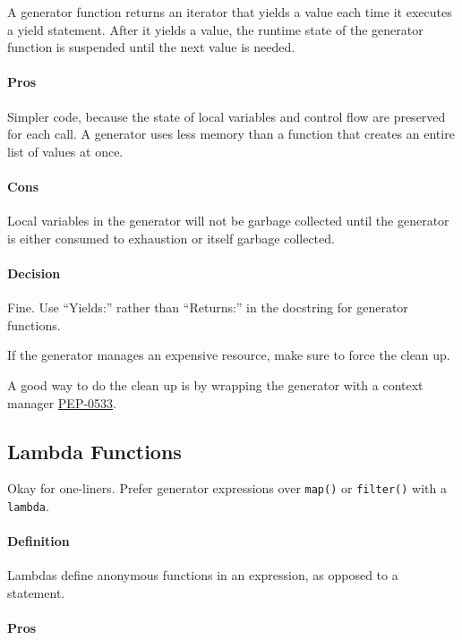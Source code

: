 \documentclass[
]{article}
\begin{document}
A generator function returns an iterator that yields a value each time
it executes a yield statement. After it yields a value, the runtime
state of the generator function is suspended until the next value is
needed.

\paragraph{Pros}

Simpler code, because the state of local variables and control flow are
preserved for each call. A generator uses less memory than a function
that creates an entire list of values at once.

\paragraph{Cons}

Local variables in the generator will not be garbage collected until the
generator is either consumed to exhaustion or itself garbage collected.

\paragraph{Decision}

Fine. Use ``Yields:'' rather than ``Returns:'' in the docstring for
generator functions.

If the generator manages an expensive resource, make sure to force the
clean up.

A good way to do the clean up is by wrapping the generator with a
context manager \href{https://peps.python.org/pep-0533/}{PEP-0533}.

\subsection{Lambda Functions}

Okay for one-liners. Prefer generator expressions over \texttt{map()} or
\texttt{filter()} with a \texttt{lambda}.

\paragraph{Definition}

Lambdas define anonymous functions in an expression, as opposed to a
statement.

\paragraph{Pros}
\end{document}
